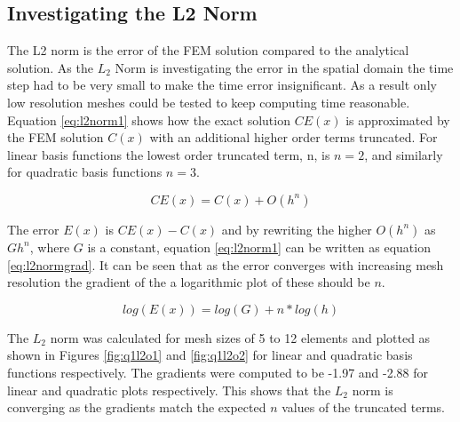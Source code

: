 \documentclass[11pt]{article}
\begin{document}
\FloatBarrier
\subsection{Investigating the L2 Norm}

The L2 norm is the error of the FEM solution compared to the analytical solution. As the $L_2$ Norm is investigating the error in the  spatial domain the time step had to be very small to make the time error insignificant. As a result only low resolution meshes could be tested to keep computing time reasonable. Equation \ref{eq:l2norm1} shows how the exact solution $CE(x)$ is approximated by the FEM solution $C(x)$ with an additional higher order terms truncated. For linear basis functions the lowest order truncated term, n,  is $n = 2$, and similarly for quadratic basis functions $n = 3$.

\begin{equation} \label{eq:l2norm1}
CE(x) = C(x) + O(h^n)
\end{equation}

The error $E(x)$ is $CE(x) - C(x)$ and by rewriting the higher $O(h^n)$ as $Gh^n$, where $G$ is a constant, equation \ref{eq:l2norm1} can be written as equation \ref{eq:l2normgrad}. It can be seen that as the error converges with increasing mesh resolution the gradient of the a logarithmic plot of these should be $n$. 


\begin{equation} \label{eq:l2normgrad}
log(E(x)) = log(G) + n*log(h)
\end{equation}

The $L_2$ norm was calculated for mesh sizes of 5 to 12 elements and plotted as shown in Figures \ref{fig:q1l2o1} and \ref{fig:q1l2o2} for linear and quadratic basis functions respectively. The gradients were computed to be -1.97 and -2.88 for linear and quadratic plots respectively. This shows that the $L_2$ norm is converging as the gradients match the expected $n$ values of the truncated terms. 
\end{document}
